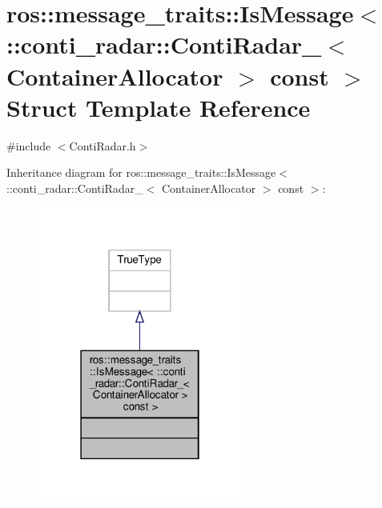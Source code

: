 \hypertarget{structros_1_1message__traits_1_1IsMessage_3_01_1_1conti__radar_1_1ContiRadar___3_01ContainerAllocator_01_4_01const_01_4}{}\section{ros\+:\+:message\+\_\+traits\+:\+:Is\+Message$<$ \+:\+:conti\+\_\+radar\+:\+:Conti\+Radar\+\_\+$<$ Container\+Allocator $>$ const $>$ Struct Template Reference}
\label{structros_1_1message__traits_1_1IsMessage_3_01_1_1conti__radar_1_1ContiRadar___3_01ContainerAllocator_01_4_01const_01_4}


{\ttfamily \#include $<$Conti\+Radar.\+h$>$}



Inheritance diagram for ros\+:\+:message\+\_\+traits\+:\+:Is\+Message$<$ \+:\+:conti\+\_\+radar\+:\+:Conti\+Radar\+\_\+$<$ Container\+Allocator $>$ const $>$\+:\nopagebreak
\begin{figure}[H]
\begin{center}
\leavevmode
\includegraphics[width=190pt]{da/dda/structros_1_1message__traits_1_1IsMessage_3_01_1_1conti__radar_1_1ContiRadar___3_01ContainerAllo06e3190fa1c8ff30e74bb1c849b2956b}
\end{center}
\end{figure}


